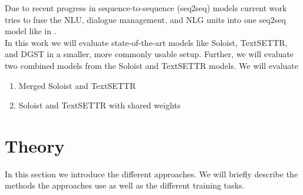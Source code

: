 \documentclass[twocolumn]{tum-article}
\begin{document}
Due to recent progress in sequence-to-sequence (seq2seq) models \cite{radford2019language, raffel2019exploring} current work tries to fuse the NLU, dialogue management, and NLG units into one seq2seq model like in \cite{peng2020soloist}. \\
In this work we will evaluate state-of-the-art models like Soloist, TextSETTR, and DGST in a smaller, more commonly usable setup. Further, we will evaluate two combined models from the Soloist and TextSETTR models. We will evaluate 
\begin{enumerate}
\item Merged Soloist and TextSETTR
\item Soloist and TextSETTR with shared weights
\end{enumerate}
\section{Theory}
In this section we introduce the different approaches. We will briefly describe the methods the approaches use as well as the different training tasks. 
\end{document}
